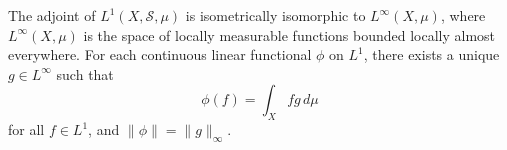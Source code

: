 The adjoint of $L^1(X, \mathcal{S}, \mu)$ is isometrically isomorphic to $L^\infty(X, \mu)$, where $L^\infty(X, \mu)$ is the space of locally measurable functions bounded locally almost everywhere. For each continuous linear functional $\phi$ on $L^1$, there exists a unique $g \in L^\infty$ such that
$$\phi(f) = \int_X f g \, d\mu$$
for all $f \in L^1$, and $\|\phi\| = \|g\|_\infty$.
